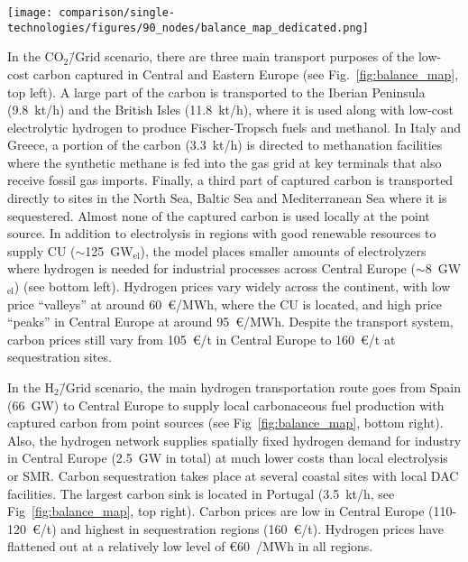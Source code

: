 \documentclass[twocolumn]{article}
\newcommand{\carbongrid}{CO$_2$\=/Grid}
\newcommand{\carbonscenario}{CO$_2$\=/Grid scenario}
\newcommand{\hydrogenscenario}{H$_2$\=/Grid scenario}
\begin{document}
\begin{figure*}[ht!]
    \centering
    \texttt{[image: comparison/single-technologies/figures/90\_nodes/balance\_map\_dedicated.png]}
    \caption{Average production, consumption, flows and prices of the carbon (top line) and hydrogen (bottom line) sectors in the \carbongrid{} (left) and the \hydrogenscenario{} (right). For each region, upper semicircles show the average production per technology, lower semicircles the consumption, and colors the average marginal prices. Lines and arrows show the interregional transportation. Carbon sequestration offshore is drawn in full circles.
    }
    \label{fig:balance_map}
\end{figure*}


In the \carbonscenario, there are three main transport purposes of the low-cost carbon captured in Central and Eastern Europe (see Fig.~\ref{fig:balance_map}, top left). A large part of the carbon is transported to the Iberian Peninsula (9.8~kt/h) and the British Isles (11.8~kt/h), where it is used along with low-cost electrolytic hydrogen to produce Fischer-Tropsch fuels and methanol. In Italy and Greece, a portion of the carbon (3.3~kt/h) is directed to methanation facilities where the synthetic methane is fed into the gas grid at key terminals that also receive fossil gas imports. Finally, a third part of captured carbon is transported directly to sites in the North Sea, Baltic Sea and Mediterranean Sea where it is sequestered. Almost none of the captured carbon is used locally at the point source. In addition to electrolysis in regions with good renewable resources to supply CU ($\sim$125~GW$_\text{el}$), the model places smaller amounts of electrolyzers where hydrogen is needed for industrial processes across Central Europe ($\sim$8~GW$_\text{el}$) (see bottom left). Hydrogen prices vary widely across the continent, with low price ``valleys'' at around 60~€/MWh, where the CU is located, and high price ``peaks'' in Central Europe at around 95~€/MWh. Despite the transport system, carbon prices still vary from 105~€/t in Central Europe to 160~€/t at sequestration sites.

In the \hydrogenscenario{}, the main hydrogen transportation route goes from Spain (66~GW) to Central Europe to supply local carbonaceous fuel production with captured carbon from point sources (see Fig~\ref{fig:balance_map}, bottom right). Also, the hydrogen network supplies spatially fixed hydrogen demand for industry in Central Europe (2.5~GW in total) at much lower costs than local electrolysis or SMR. Carbon sequestration takes place at several coastal sites with local DAC facilities. The largest carbon sink is located in Portugal (3.5~kt/h, see Fig~\ref{fig:balance_map}, top right). Carbon prices are low in Central Europe (110-120~€/t) and highest in sequestration regions (160~€/t). Hydrogen prices have flattened out at a relatively low level of €60~/MWh in all regions.
\end{document}
